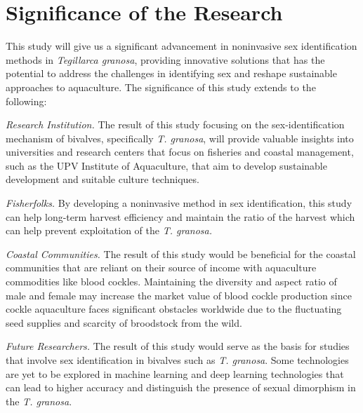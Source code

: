 \section{Significance of the Research}
\label{sec:significance}

This study will give us a significant advancement in noninvasive sex identification methods in \textit{Tegillarca granosa}, providing innovative solutions that has the potential to address the challenges in identifying sex and reshape sustainable approaches to aquaculture. The significance of this study extends to the following:

\textit{Research Institution.} The result of this study focusing on the sex-identification mechanism of bivalves, specifically \textit{T. granosa}, will provide valuable insights into universities and research centers that focus on fisheries and coastal management, such as the UPV Institute of Aquaculture, that aim to develop sustainable development and suitable culture techniques.

\textit{Fisherfolks.} By developing a noninvasive method in sex identification, this study can help long-term harvest efficiency and maintain the ratio of the harvest which can help prevent exploitation of the \textit{T. granosa.}

\textit{Coastal Communities.} The result of this study would be beneficial for the coastal communities that are reliant on their source of income with aquaculture commodities like blood cockles. Maintaining the diversity and aspect ratio of male and female may increase the market value of blood cockle production since cockle aquaculture faces significant obstacles worldwide due to the fluctuating seed supplies and scarcity of broodstock from the wild. 

\textit{Future Researchers.} The result of this study would serve as the basis for studies that involve sex identification in bivalves such as \textit{T. granosa}. Some technologies are yet to be explored in machine learning and deep learning technologies that can lead to higher accuracy and distinguish the presence of sexual dimorphism in the \textit{T. granosa}.


